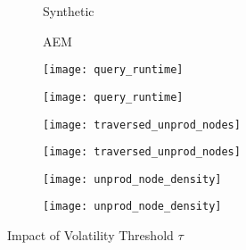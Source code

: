 \documentclass[abstracton,12pt]{scrartcl}
\theoremstyle{definition}
\begin{document}
\begin{figure}[h]
  \centering
  \begin{subfigure}{0.49\linewidth}
    \centering
    Synthetic
  \end{subfigure}
  \begin{subfigure}{0.49\linewidth}
    \centering
    AEM
  \end{subfigure}
  \begin{subfigure}{0.49\linewidth}
    \centering
    \texttt{[image: query\_runtime]}
    \caption{}
    \label{fig:query_runtime_taus_synthetic}
  \end{subfigure}
  \begin{subfigure}{0.49\linewidth}
    \centering
    \texttt{[image: query\_runtime]}
    \caption{}
    \label{fig:query_runtime_taus_aem}
  \end{subfigure}
  \begin{subfigure}{0.49\linewidth}
    \centering
    \texttt{[image: traversed\_unprod\_nodes]}
    \caption{}
    \label{fig:trav_unprod_nodes_taus_synthetic}
  \end{subfigure}
  \begin{subfigure}{0.49\linewidth}
    \centering
    \texttt{[image: traversed\_unprod\_nodes]}
    \caption{}
    \label{fig:trav_unprod_nodes_taus_aem}
  \end{subfigure}
  \begin{subfigure}{0.49\linewidth}
    \centering
    \texttt{[image: unprod\_node\_density]}
    \caption{}
    \label{fig:unprod_node_density_taus_synthetic}
  \end{subfigure}
  \begin{subfigure}{0.49\linewidth}
    \centering
    \texttt{[image: unprod\_node\_density]}
    \caption{}
    \label{fig:unprod_node_density_taus_aem}
  \end{subfigure}
  \caption{Impact of Volatility Threshold $\tau$}
  \label{fig:vol_thresh_1}
\end{figure}
\end{document}
